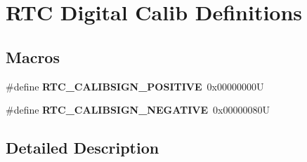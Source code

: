 \hypertarget{group___r_t_c_ex___digital___calibration___definitions}{}\section{R\+TC Digital Calib Definitions}
\label{group___r_t_c_ex___digital___calibration___definitions}
\subsection*{Macros}
\begin{DoxyCompactItemize}
\item 
\mbox{\label{group___r_t_c_ex___digital___calibration___definitions_gab2eaa5626ec9fd04a5d7565cf5553781}} 
\#define {\bfseries R\+T\+C\+\_\+\+C\+A\+L\+I\+B\+S\+I\+G\+N\+\_\+\+P\+O\+S\+I\+T\+I\+VE}~0x00000000U
\item 
\mbox{\label{group___r_t_c_ex___digital___calibration___definitions_gacb3a2435f76aa01634746bd8815bfa4c}} 
\#define {\bfseries R\+T\+C\+\_\+\+C\+A\+L\+I\+B\+S\+I\+G\+N\+\_\+\+N\+E\+G\+A\+T\+I\+VE}~0x00000080U
\end{DoxyCompactItemize}


\subsection{Detailed Description}
